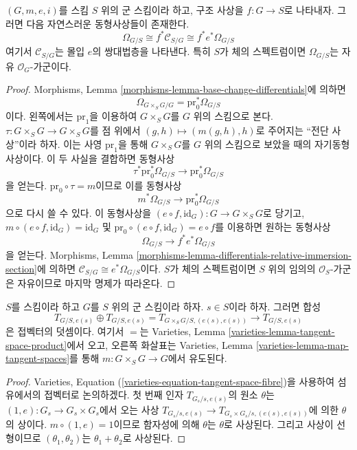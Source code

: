 \begin{lemma}
\label{lemma-group-scheme-module-differentials}
\begin{reference}
\cite[Proposition 3.15]{BookAV}
\end{reference}
$(G, m, e, i)$를 스킴 $S$ 위의 군 스킴이라 하고, 구조 사상을 $f : G \to S$로 나타내자.
그러면 다음 자연스러운 동형사상들이 존재한다.
$$
\Omega_{G/S} \cong f^*\mathcal{C}_{S/G} \cong f^*e^*\Omega_{G/S}
$$
여기서 $\mathcal{C}_{S/G}$는 몰입 $e$의 쌍대법층을 나타낸다. 특히 $S$가 체의 스펙트럼이면
$\Omega_{G/S}$는 자유 $\mathcal{O}_G$-가군이다.
\end{lemma}

\begin{proof}
Morphisms, Lemma \ref{morphisms-lemma-base-change-differentials}에 의하면
$$
\Omega_{G \times_S G/G} = \text{pr}_0^*\Omega_{G/S}
$$
이다. 왼쪽에서는 $\text{pr}_1$을 이용하여 $G \times_S G$를 $G$ 위의 스킴으로 본다.
$\tau : G \times_S G \to G \times_S G$를 점 위에서 $(g, h) \mapsto (m(g, h), h)$로 주어지는
``전단 사상''이라 하자. 이는 사영 $\text{pr}_1$을 통해 $G \times_S G$를 $G$ 위의 스킴으로 보았을 때의
자기동형사상이다. 이 두 사실을 결합하면 동형사상
$$
\tau^*\text{pr}_0^*\Omega_{G/S} \to \text{pr}_0^*\Omega_{G/S}
$$
을 얻는다. $\text{pr}_0 \circ \tau = m$이므로 이를 동형사상
$$
m^*\Omega_{G/S} \to \text{pr}_0^*\Omega_{G/S}
$$
으로 다시 쓸 수 있다. 이 동형사상을
$(e \circ f, \text{id}_G) : G \to G \times_S G$로 당기고,
$m \circ (e \circ f, \text{id}_G) = \text{id}_G$ 및
$\text{pr}_0 \circ (e \circ f, \text{id}_G) = e \circ f$를 이용하면 원하는 동형사상
$$
\Omega_{G/S} \to f^*e^*\Omega_{G/S}
$$
을 얻는다. Morphisms, Lemma
\ref{morphisms-lemma-differentials-relative-immersion-section}에 의하면
$\mathcal{C}_{S/G} \cong e^*\Omega_{G/S}$이다. $S$가 체의 스펙트럼이면 $S$ 위의 임의의
$\mathcal{O}_S$-가군은 자유이므로 마지막 명제가 따라온다.
\end{proof}

\begin{lemma}
\label{lemma-group-scheme-addition-tangent-vectors}
$S$를 스킴이라 하고 $G$를 $S$ 위의 군 스킴이라 하자. $s \in S$이라 하자. 그러면 합성
$$
T_{G/S, e(s)} \oplus T_{G/S, e(s)} = T_{G \times_S G/S, (e(s), e(s))}
\rightarrow T_{G/S, e(s)}
$$
은 접벡터의 덧셈이다. 여기서 $=$는 Varieties, Lemma
\ref{varieties-lemma-tangent-space-product}에서 오고, 오른쪽 화살표는 Varieties, Lemma
\ref{varieties-lemma-map-tangent-spaces}를 통해 $m : G \times_S G \to G$에서 유도된다.
\end{lemma}

\begin{proof}
Varieties, Equation (\ref{varieties-equation-tangent-space-fibre})을 사용하여 섬유에서의 접벡터로 논의하겠다.
첫 번째 인자 $T_{G_s/s, e(s)}$의 원소 $\theta$는 $(1, e) : G_s \to G_s \times G_s$에서 오는 사상
$T_{G_s/s, e(s)} \to T_{G_s \times G_s/s, (e(s), e(s))}$에 의한 $\theta$의 상이다.
$m \circ (1, e) = 1$이므로 함자성에 의해 $\theta$는 $\theta$로 사상된다. 그리고 사상이 선형이므로
$(\theta_1, \theta_2)$는 $\theta_1 + \theta_2$로 사상된다.
\end{proof}





